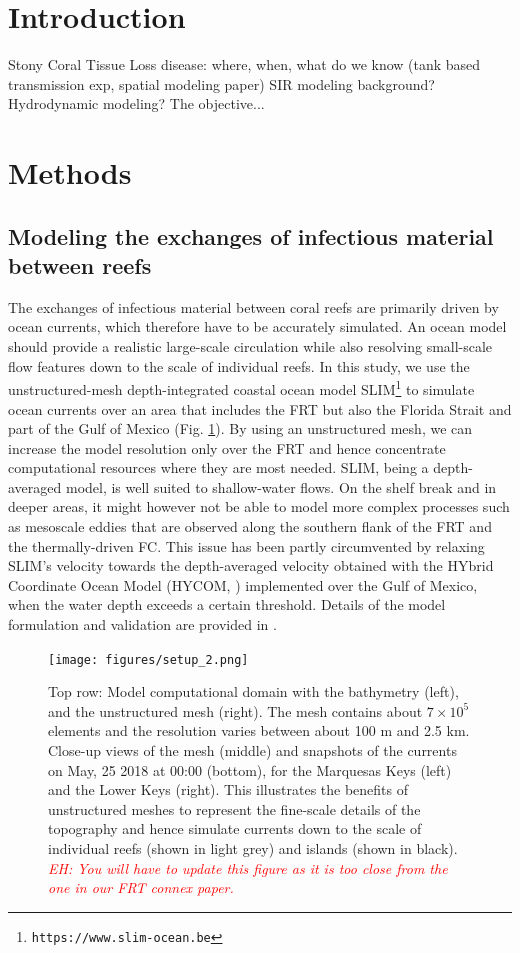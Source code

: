 \documentclass[utf8]{frontiersSCNS}
\newcommand{\emphc}[1]{\emph{\textcolor{red}{#1}}}
\begin{document}
\section{Introduction}
Stony Coral Tissue Loss disease: where, when, what do we know (tank based transmission exp, spatial modeling paper)
SIR modeling background?
Hydrodynamic modeling?
The objective...

\section{Methods}

\subsection{Modeling the exchanges of infectious material between reefs}
The exchanges of infectious material between coral reefs are primarily driven by ocean currents, which therefore have to be accurately simulated. An ocean model should provide a realistic large-scale circulation while also resolving small-scale flow features down to the scale of individual reefs. In this study, we use the unstructured-mesh depth-integrated coastal ocean model SLIM\footnote{{\tt https://www.slim-ocean.be}} to simulate ocean currents over an area that includes the FRT but also the Florida Strait and part of the Gulf of Mexico (Fig. \ref{fig:setup}). By using an unstructured mesh, we can increase the model resolution only over the FRT and hence concentrate computational resources where they are most needed. SLIM, being a depth-averaged model, is well suited to shallow-water flows. On the shelf break and in deeper areas, it might however not be able to model more complex processes such as mesoscale eddies that are observed along the southern flank of the FRT and the thermally-driven FC. This issue has been partly circumvented by relaxing SLIM's velocity towards the depth-averaged velocity obtained with the HYbrid Coordinate Ocean Model (HYCOM, \cite{Chassignet2007}) implemented over the Gulf of Mexico, when the water depth exceeds a certain threshold. Details of the model formulation and validation are provided in \cite{frys20}. 

\begin{figure}
    \centering
    \texttt{[image: figures/setup\_2.png]}
    \caption{Top row: Model computational domain with the bathymetry (left), and the unstructured mesh (right). The mesh contains about $7 \times 10^5$ elements and the resolution varies between about 100 m and 2.5 km. Close-up views of the mesh (middle) and snapshots of the currents on May, 25 2018 at 00:00 (bottom), for the Marquesas Keys (left) and the Lower Keys (right). This illustrates the benefits of unstructured meshes to represent the fine-scale details of the topography and hence simulate currents down to the scale of individual reefs (shown in light grey) and islands (shown in black). \emphc{EH: You will have to update this figure as it is too close from the one in our FRT connex paper.}}
    \label{fig:setup}
\end{figure}
\end{document}
